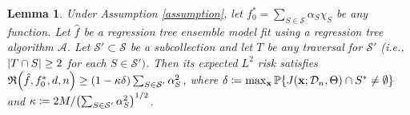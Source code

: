 \documentclass[11pt]{article}
\newtheorem{lemma}[theorem]{Lemma}
\newcommand{\bx}{\mathbf{x}}
\DeclarePairedDelimiter{\braces}{\lbrace}{\rbrace}
\DeclarePairedDelimiter{\paren}{(}{)}
\DeclarePairedDelimiter{\abs}{|}{|}
\renewcommand{\P}{\mathbb{P}}
\newcommand{\Var}{\operatorname{Var}}
\newcommand{\nfeats}{d}
\newcommand{\nsamples}{n}
\newcommand{\data}[1][n]{\mathcal{D}_{#1}}
\newcommand{\suppset}{S^*}
\newcommand{\monomial}{\chi}
\newcommand{\traversal}{T}
\newcommand{\fcoefs}{\mathcal{S}}
\newcommand{\alg}{\mathcal{A}}
\newcommand{\objective}{\mathfrak{R}}
\newcommand{\ybound}{M}
\begin{document}
\begin{lemma}
\label{lem:covariate_selection_ensemble_v2}
    Under Assumption \ref{assumption}, let $f_0^*=\sum_{S \in \fcoefs} \alpha_S\monomial_S$ be any function. 
    Let $\hat f$ be a regression tree ensemble model fit using a regression tree algorithm $\alg$.
    Let $\fcoefs' \subset \fcoefs$ be a subcollection and let $\traversal$ be any traversal for $\fcoefs'$ (i.e., $\abs{T\cap S} \geq 2$ for each $S \in \fcoefs')$.
    Then its expected $L^2$ risk satisfies $\objective\paren*{\hat f, f^*_0,\nfeats,\nsamples} \geq (1-\kappa\delta)\sum_{S \in \fcoefs'} \alpha_S^2$, where $\delta \coloneqq \max_{\bx}\P\braces*{J(\bx;\data,\Theta)\cap \suppset \neq \emptyset }$ and $\kappa \coloneqq 2\ybound/\paren*{\sum_{S \in \fcoefs'} \alpha_S^2}^{1/2}$.
\end{lemma}
\end{document}

